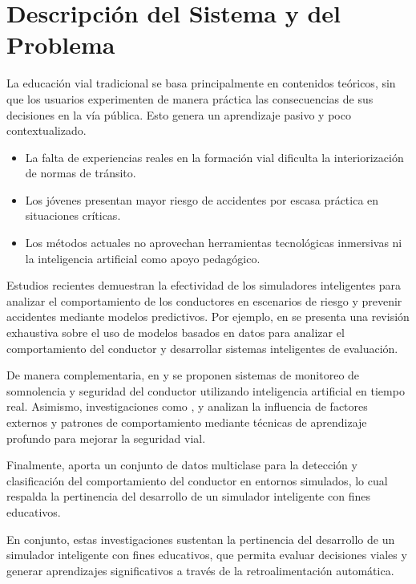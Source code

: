 \documentclass[12pt]{article}
\begin{document}
\section{Descripción del Sistema y del Problema}
La educación vial tradicional se basa principalmente en contenidos teóricos, sin que los usuarios experimenten de manera práctica las consecuencias de sus decisiones en la vía pública. Esto genera un aprendizaje pasivo y poco contextualizado.

\begin{itemize}
    \item La falta de experiencias reales en la formación vial dificulta la interiorización de normas de tránsito.
    \item Los jóvenes presentan mayor riesgo de accidentes por escasa práctica en situaciones críticas.
    \item Los métodos actuales no aprovechan herramientas tecnológicas inmersivas ni la inteligencia artificial como apoyo pedagógico.
\end{itemize}

Estudios recientes demuestran la efectividad de los simuladores inteligentes para analizar el comportamiento de los conductores en escenarios de riesgo y prevenir accidentes mediante modelos predictivos. Por ejemplo, en \cite{Shirole2025} se presenta una revisión exhaustiva sobre el uso de modelos basados en datos para analizar el comportamiento del conductor y desarrollar sistemas inteligentes de evaluación. 

De manera complementaria, en \cite{Harb2025} y \cite{Almodhwahi2025} se proponen sistemas de monitoreo de somnolencia y seguridad del conductor utilizando inteligencia artificial en tiempo real. Asimismo, investigaciones como \cite{Kaselouris202649}, \cite{Nicolosi2025} y \cite{Althabhawee2025317} analizan la influencia de factores externos y patrones de comportamiento mediante técnicas de aprendizaje profundo para mejorar la seguridad vial. 

Finalmente, \cite{Afridi2025} aporta un conjunto de datos multiclase para la detección y clasificación del comportamiento del conductor en entornos simulados, lo cual respalda la pertinencia del desarrollo de un simulador inteligente con fines educativos.

En conjunto, estas investigaciones sustentan la pertinencia del desarrollo de un simulador inteligente con fines educativos, que permita evaluar decisiones viales y generar aprendizajes significativos a través de la retroalimentación automática.
\end{document}
